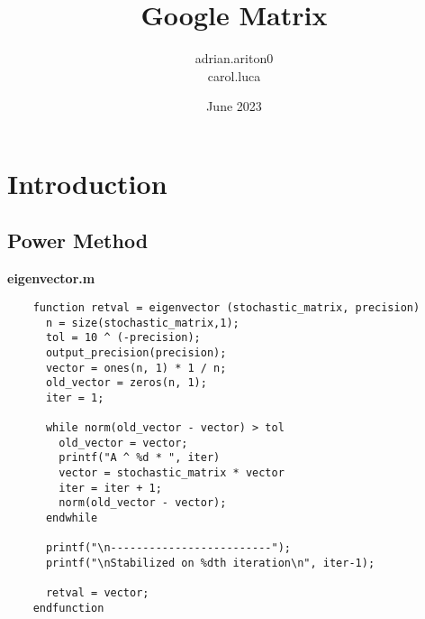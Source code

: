 \documentclass{article}
\title{Google Matrix}
\author{adrian.ariton0 \\ carol.luca}
\date{June 2023}
\begin{document}
\maketitle

\section{Introduction}
\subsection{Power Method}

    \textbf{eigenvector.m}
    \begin{lstlisting}
    function retval = eigenvector (stochastic_matrix, precision)
      n = size(stochastic_matrix,1);
      tol = 10 ^ (-precision);
      output_precision(precision);
      vector = ones(n, 1) * 1 / n;
      old_vector = zeros(n, 1);
      iter = 1;
    
      while norm(old_vector - vector) > tol
        old_vector = vector;
        printf("A ^ %d * ", iter)
        vector = stochastic_matrix * vector
        iter = iter + 1;
        norm(old_vector - vector);
      endwhile
    
      printf("\n-------------------------");
      printf("\nStabilized on %dth iteration\n", iter-1);
    
      retval = vector;
    endfunction
    \end{lstlisting}  
\end{document}
